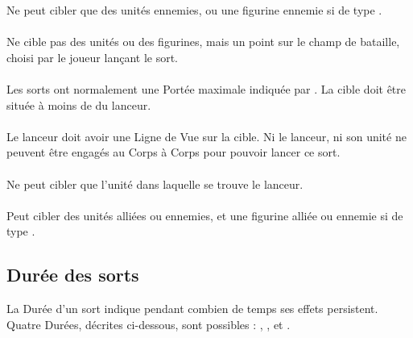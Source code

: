 Ne peut cibler que des unités ennemies, ou une figurine ennemie si de type \focused{}.

\paragraph{\ground}

Ne cible pas des unités ou des figurines, mais un point sur le champ de bataille, choisi par le joueur lançant le sort.

\paragraph{}

Les sorts ont normalement une Portée maximale indiquée par \og {} \fg{}. La cible doit être située à moins de  du lanceur.

\paragraph{\missile}

Le lanceur doit avoir une Ligne de Vue sur la cible. Ni le lanceur, ni son unité ne peuvent être engagés au Corps à Corps pour pouvoir lancer ce sort.

\paragraph{\castersunit}

Ne peut cibler que l'unité dans laquelle se trouve le lanceur.

\paragraph{\universal}

Peut cibler des unités alliées ou ennemies, et une figurine alliée ou ennemie si de type \focused{}.


\subsection{Durée des sorts}

La Durée d'un sort indique pendant combien de temps ses effets persistent. Quatre Durées, décrites ci-dessous, sont possibles : \lastsoneturn{}, \instant{}, \permanent{} et \remainsinplay{}.

\paragraph{\lastsoneturn}

